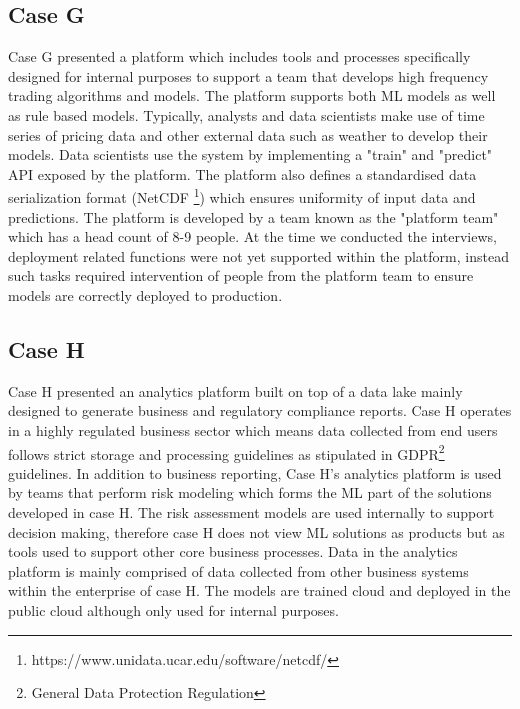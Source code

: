 \subsection{Case G}
Case G presented a platform which includes tools and processes specifically designed for internal purposes to support a team that develops high frequency trading algorithms and models. The platform supports both ML models as well as rule based models. Typically, analysts and data scientists make use of time series of pricing data and other external data such as weather to develop their models. Data scientists use the system by implementing a "train" and "predict" API exposed by the platform. The platform also defines a standardised data serialization format (NetCDF \footnote{https://www.unidata.ucar.edu/software/netcdf/}) which ensures uniformity of input data and predictions. The platform is developed by a team known as the "platform team" which has a head count of 8-9 people. At the time we conducted the interviews, deployment related functions were not yet supported within the platform, instead such tasks required intervention of people from the platform team to ensure models are correctly deployed to production. 

\subsection{Case H}
Case H presented an analytics platform built on top of a data lake mainly designed to generate business and regulatory compliance reports. Case H operates in a highly regulated business sector which means data collected from end users follows strict storage and processing guidelines as stipulated in GDPR\footnote{General Data Protection Regulation} guidelines. In addition to business reporting, Case H's analytics platform is used  by teams that perform risk modeling which forms the ML part of the solutions developed in case H. The risk assessment models are used internally to support decision making, therefore case H does not view ML solutions as products but as tools used to support other core business processes. Data in the analytics platform is mainly comprised of data collected from other business systems within the enterprise of case H. The models are trained cloud and deployed in the public cloud although only used for internal purposes.

